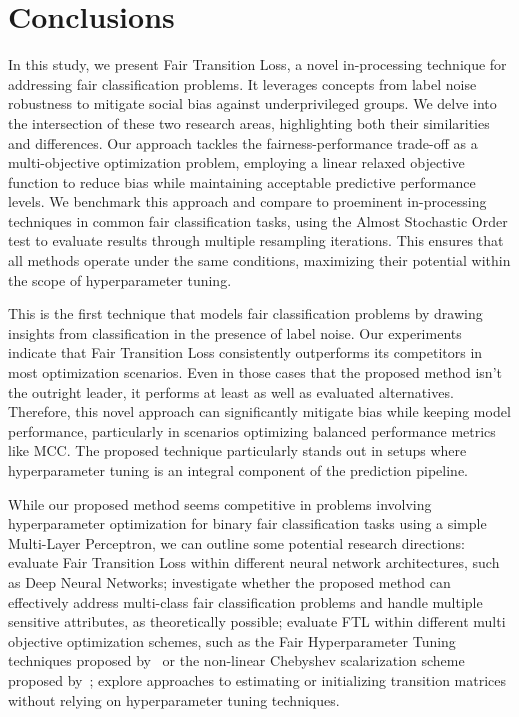 \chapter{Conclusions}

\label{sec:conclusions}

In this study, we present Fair Transition Loss, a novel in-processing technique for addressing fair classification problems. It leverages concepts from label noise robustness to mitigate social bias against underprivileged groups. We delve into the intersection of these two research areas, highlighting both their similarities and differences. Our approach tackles the fairness-performance trade-off as a multi-objective optimization problem, employing a linear relaxed objective function to reduce bias while maintaining acceptable predictive performance levels. We benchmark this approach and compare to proeminent in-processing techniques in common fair classification tasks, using the Almost Stochastic Order test to evaluate results through multiple resampling iterations. This ensures that all methods operate under the same conditions, maximizing their potential within the scope of hyperparameter tuning.

This is the first technique that models fair classification problems by drawing insights from classification in the presence of label noise. Our experiments indicate that Fair Transition Loss consistently outperforms its competitors in most optimization scenarios. Even in those cases that the proposed method isn't the outright leader, it performs at least as well as evaluated alternatives. Therefore, this novel approach can significantly mitigate bias while keeping model performance, particularly in scenarios optimizing balanced performance metrics like MCC. The proposed technique particularly stands out in setups where hyperparameter tuning is an integral component of the prediction pipeline.

While our proposed method seems competitive in problems involving hyperparameter optimization for binary fair classification tasks using a simple Multi-Layer Perceptron, we can outline some potential research directions: evaluate Fair Transition Loss within different neural network architectures, such as Deep Neural Networks; investigate whether the proposed method can effectively address multi-class fair classification problems and handle multiple sensitive attributes, as theoretically possible; evaluate FTL within different multi objective optimization schemes, such as the Fair Hyperparameter Tuning techniques proposed by~\cite{Cruz2021} or the non-linear Chebyshev scalarization scheme proposed by~\cite{Wei2022}; explore approaches to estimating or initializing transition matrices without relying on hyperparameter tuning techniques. 

